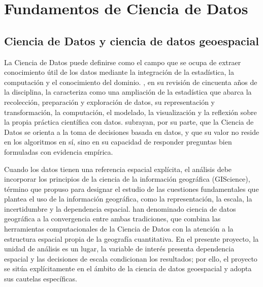 \section{Fundamentos de Ciencia de Datos}
\label{sec:fundamentos-cd}

\subsection{Ciencia de Datos y ciencia de datos geoespacial}
\label{subsec:ciencia-datos}

La Ciencia de Datos puede definirse como el campo que se ocupa de extraer conocimiento útil
de los datos mediante la integración de la estadística, la computación y el conocimiento del
dominio. \textcite{donoho2017}, en su revisión de cincuenta años de la disciplina, la
caracteriza como una ampliación de la estadística que abarca la recolección, preparación y
exploración de datos, su representación y transformación, la computación, el modelado, la
visualización y la reflexión sobre la propia práctica científica con datos.
\textcite{provost2013} subrayan, por su parte, que la Ciencia de Datos se orienta a la toma
de decisiones basada en datos, y que su valor no reside en los algoritmos en sí, sino en su
capacidad de responder preguntas bien formuladas con evidencia empírica.

Cuando los datos tienen una referencia espacial explícita, el análisis debe incorporar los
principios de la ciencia de la información geográfica (GIScience), término que
\textcite{goodchild1992} propuso para designar el estudio de las cuestiones fundamentales que
plantea el uso de la información geográfica, como la representación, la escala, la
incertidumbre y la dependencia espacial. \textcite{singleton2021} han denominado ciencia de
datos geográfica a la convergencia entre ambas tradiciones, que combina las herramientas
computacionales de la Ciencia de Datos con la atención a la estructura espacial propia de la
geografía cuantitativa. En el presente proyecto, la unidad de análisis es un lugar, la
variable de interés presenta dependencia espacial y las decisiones de escala condicionan los
resultados; por ello, el proyecto se sitúa explícitamente en el ámbito de la ciencia de
datos geoespacial y adopta sus cautelas específicas.

